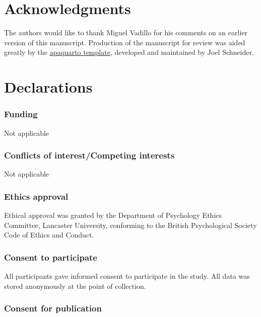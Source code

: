 \documentclass[
  man,
  floatsintext,
  longtable,
  nolmodern,
  notxfonts,
  notimes,
  colorlinks=true,linkcolor=blue,citecolor=blue,urlcolor=blue]{apa7}
\begin{document}
\newpage

\section{Acknowledgments}\label{acknowledgments}

The authors would like to thank Miguel Vadillo for his comments on an
earlier version of this manuscript. Production of the manuscript for
review was aided greatly by the
\href{https://github.com/wjschne/apaquarto}{apaquarto template},
developed and maintained by Joel Schneider.

\newpage

\section{Declarations}\label{declarations}

\subsubsection{Funding}\label{funding}

Not applicable

\subsubsection{Conflicts of interest/Competing
interests}\label{conflicts-of-interestcompeting-interests}

Not applicable

\subsubsection{Ethics approval}\label{ethics-approval}

Ethical approval was granted by the Department of Psychology Ethics
Committee, Lancaster University, conforming to the British Psychological
Society Code of Ethics and Conduct.

\subsubsection{Consent to participate}\label{consent-to-participate}

All participants gave informed consent to participate in the study. All
data was stored anonymously at the point of collection.

\subsubsection{Consent for publication}\label{consent-for-publication}
\end{document}
